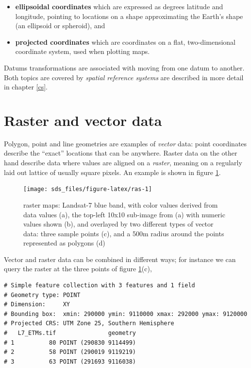 \documentclass[]{book}
\begin{document}
\begin{itemize}
\item
  \textbf{ellipsoidal coordinates} which are expressed as degrees
  latitude and longitude, pointing to locations on a shape
  approximating the Earth's shape (an ellipsoid or spheroid), and
\item
  \textbf{projected coordinates} which are coordinates on a flat,
  two-dimensional coordinate system, used when plotting maps.
\end{itemize}

Datums transformations are associated with moving from one datum
to another. Both topics are covered by \emph{spatial reference systems}
are described in more detail in chapter \ref{cs}.

\hypertarget{rasterize}{%
\section{Raster and vector data}\label{rasterize}}

Polygon, point and line geometries are examples of \emph{vector} data:
point coordinates describe the ``exact'' locations that can be
anywhere. Raster data on the other hand describe data where values
are aligned on a \emph{raster}, meaning on a regularly laid out lattice of
usually square pixels. An example is shown in figure \ref{fig:ras}.

\begin{figure}

{\centering \texttt{[image: sds\_files/figure-latex/ras-1]} 

}

\caption{raster maps: Landsat-7 blue band, with color values derived from data values (a), the top-left 10x10 sub-image from (a) with numeric values shown (b), and overlayed by two different types of vector data: three sample points (c), and a 500m radius around the points represented as polygons (d)}\label{fig:ras}
\end{figure}

Vector and raster data can be combined in different ways; for instance we can query the raster at the three points of figure \ref{fig:ras}(c),

\begin{verbatim}
# Simple feature collection with 3 features and 1 field
# Geometry type: POINT
# Dimension:     XY
# Bounding box:  xmin: 290000 ymin: 9110000 xmax: 292000 ymax: 9120000
# Projected CRS: UTM Zone 25, Southern Hemisphere
#   L7_ETMs.tif               geometry
# 1          80 POINT (290830 9114499)
# 2          58 POINT (290019 9119219)
# 3          63 POINT (291693 9116038)
\end{verbatim}
\end{document}
